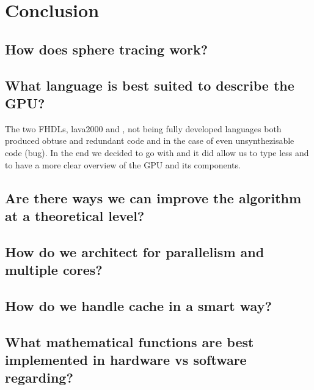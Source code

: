 \chapter{Conclusion}
	\section{How does sphere tracing work?}

	\section{What language is best suited to describe the GPU?}
	
	The two FHDLs, lava2000 and \clash, not being fully developed languages both produced obtuse and redundant code and in the case of \clash even unsynthezisable code (bug). In the end we decided to go with \clash and it did allow us to type less and to have a more clear overview of the GPU and its components.

	\section{Are there ways we can improve the algorithm at a theoretical level?}



	\section{How do we architect for parallelism and multiple cores?}

	\section{How do we handle cache in a smart way?}

	\section{What mathematical functions are best implemented in hardware vs software regarding?}